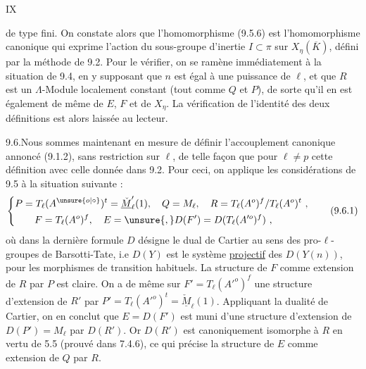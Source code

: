 \hfill IX

de type fini. On constate alors que l'homomorphisme (9.5.6) est l'homomorphisme canonique qui exprime l'action du sous-groupe d'inertie $I\subset\pi$ sur $X_\eta(\overline K)$, défini par la méthode de 9.2. Pour le vérifier, on se ramène immédiatement à la situation de 9.4, en y supposant que $n$ est égal à une puissance de $\ell$, et que $R$ est un $\Lambda$-Module localement constant (tout comme $Q$ et $P$), de sorte qu'il en est également de même de $E$, $F$ et de $X_\eta$. La vérification de l'identité des deux définitions est alors laissée au lecteur.

9.6.\quad Nous sommes maintenant en mesure de définir l'accouplement canonique annoncé (9.1.2), sans restriction sur $\ell$, de telle façon que pour $\ell\neq p$ cette définition  avec celle donnée dans 9.2. Pour ceci, on applique les considérations de 9.5 à la situation suivante :
\[
\left\{\begin{aligned}
 &P=T_\ell(A^{\unsure{o|\circ}})^t=\underline{\check M}'_\ell(1),\quad Q=M_\ell,\quad R=T_\ell(A^o)^f/T_\ell(A^o)^t\ ,\\
 &\hspace{2em}F=T_\ell(A^o)^f,\quad E=\unsure{,}D(F')=D(T_\ell(A'^{o})^f)\ ,
\end{aligned}\right.
\tag*{(9.6.1)}
\]
où dans la dernière formule $D$ désigne le dual de Cartier au sens des pro-$\ell$-groupes de Barsotti-Tate, i.e $D(Y)$ est le système \uline{projectif} des $D(Y(n))$, pour les morphismes de transition habituels. La structure de $F$ comme extension de $R$ par $P$ est claire. On a de même sur $F'=T_\ell(A'^{o})^f$ une structure d'extension de $R'$ par $P'=T_\ell(A'^{o})^t=\underline{\check M}_\ell(1)$. Appliquant la dualité de Cartier, on en conclut que $E=D(F')$ est muni d'une structure d'extension de $D(P')=M_\ell$ par $D(R')$. Or $D(R')$ est canoniquement isomorphe à $R$ en vertu de 5.5 (prouvé dans 7.4.6), ce qui précise la structure de $E$ comme extension de $Q$ par $R$.
